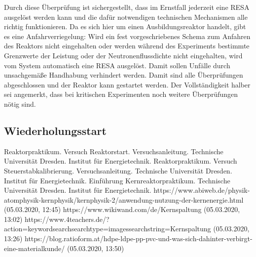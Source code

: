 \documentclass[german,  %
parskip=full,  %
]{scrartcl}
\begin{document}
Durch diese Überprüfung ist sichergestellt, dass im Ernstfall jederzeit eine RESA ausgelöst werden kann und die dafür notwendigen technischen Mechanismen alle richtig funktionieren. Da es sich hier um einen Ausbildungsreaktor handelt, gibt es eine Anfahrverriegelung: Wird ein fest vorgeschriebenes Schema zum Anfahren des Reaktors nicht eingehalten oder werden während des Experiments bestimmte Grenzwerte der Leistung oder der Neutronenflussdichte nicht eingehalten, wird vom System automatisch eine RESA ausgelöst. Damit sollen Unfälle durch unsachgemäße Handhabung verhindert werden. Damit sind alle Überprüfungen abgeschlossen und der Reaktor kann gestartet werden. Der Vollständigkeit halber sei angemerkt, dass bei kritischen Experimenten noch weitere Überprüfungen nötig sind.
\subsection{Wiederholungsstart}
    \begin{thebibliography}{9}
    Reaktorpraktikum. Versuch Reaktorstart. Versuchsanleitung. Technische Universität Dresden. Institut für Energietechnik.
    Reaktorpraktikum. Versuch Steuerstabkalibrierung. Versuchsanleitung. Technische Universität Dresden. Institut für           Energietechnik.
    Einführung Kernreaktorpraktikum. Technische Universität Dresden. Institut für           Energietechnik.
    https://www.abiweb.de/physik-atomphysik-kernphysik/kernphysik-2/anwendung-nutzung-der-kernenergie.html (05.03.2020,      12:45)
   https://www.wikiwand.com/de/Kernspaltung (05.03.2020, 13:02)
  https://www.4teachers.de/?action=keywordsearchsearchtype=imagessearchstring=Kernspaltung (05.03.2020, 13:26)
https://blog.ratioform.at/hdpe-ldpe-pp-pvc-und-was-sich-dahinter-verbirgt-eine-materialkunde/ (05.03.2020, 13:50)


    \end{thebibliography}

\end{document}
